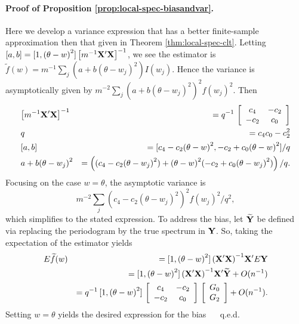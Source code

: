 \documentclass[12p E.Lt,psfig]{article} %
\begin{document}
\paragraph{Proof of Proposition \ref{prop:local-spec-biasandvar}.}
 Here we develop a variance  expression that has  a better finite-sample approximation then that given
  in Theorem \ref{thm:local-spec-clt}.
 Letting $[ a,  b] = [1, {(\theta - w) }^2 ] \,  { \left[  m^{-1} {\bf X}^{\prime} {\bf X} \right] }^{-1}$,
   we see the estimator is $\tilde{f} (w) = m^{-1} \sum_j (a + b {(\theta - w_j)}^2 ) I(w_j)$.
    Hence the variance is asymptotically given by
    $m^{-2} \sum_j { (a + b {(\theta - w_j)}^2 )}^2  {f(w_j) }^2$.
 Then
 \begin{eqnarray*}
  &  { \left[ m^{-1} {\bf X}^{\prime} {\bf X} \right] }^{-1}  & =    q^{-1} \,  \left[ \begin{array}{cc}
   c_4  & - c_2 \\   - c_2 & c_0   \end{array} \right]  \\
    & q & = c_4 c_0 - c_2^2 \\
    & [a,  b ] &  =  [ c_4 - c_2  {(\theta -w )}^2,  -c_2 + c_0 {( \theta - w)}^2 ]/q   \\
    &  a + b {(\theta - w_j)}^2  & =
    \left(  (c_4 - c_2 {( \theta - w_j )}^2 ) + {(\theta - w)}^2  (-c_2 + c_0 {(\theta - w_j)}^2 ) \right)/q.
\end{eqnarray*}
  Focusing on the case $w = \theta$, the asymptotic variance is
\[
 m^{-2} \sum_j {    (c_4 - c_2 {( \theta - w_j )}^2 ) }^2  {f(w_j) }^2 /q^2,
 \]
  which simplifies to the stated expression.
  To address the bias, let $\widetilde{\bf {Y}} $ be defined via replacing
  the periodogram by the true spectrum in ${\bf Y}$.
  So, taking the expectation of the estimator yields
  \begin{eqnarray*}
  &  E \widetilde{f} (w) & = [1, {(\theta - w)}^2] \, {( {\bf X}^{\prime} {\bf X} )}^{-1} {\bf X}^{\prime} E {\bf Y} \\
  &  & =  [1, {(\theta - w)}^2] \, {( {\bf X}^{\prime} {\bf X} )}^{-1} {\bf X}^{\prime} \widetilde{\bf Y}  + O(n^{-1}) \\
 & & = q^{-1} \,  [1, {(\theta - w)}^2] \, \left[ \begin{array}{cc} c_4 & - c_2 \\ -c_2 & c_0 \end{array} \right]
  \, \left[ \begin{array}{c} G_0 \\ G_2 \end{array} \right] +     O(n^{-1}).
\end{eqnarray*}
Setting $w = \theta$ yields the desired expression for the bias  
$\quad$ q.e.d.
\end{document}
